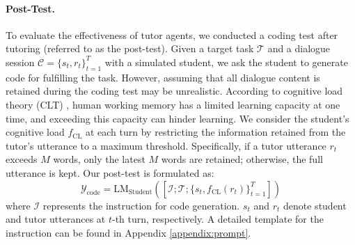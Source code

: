 \paragraph{Post-Test.}
To evaluate the effectiveness of tutor agents, we conducted a coding test after tutoring (referred to as the post-test). Given a target task $\mathcal{T}$ and a dialogue session $\mathcal{C}=\{s_t, r_t\}_{t=1}^{T}$ with a simulated student, we ask the student to generate code for fulfilling the task. 
However, assuming that all dialogue content is retained during the coding test may be unrealistic. According to cognitive load theory (CLT) \cite{miller1956magical,sweller2011cognitive}, human working memory has a limited learning capacity at one time, and exceeding this capacity can hinder learning. We consider the student's cognitive load $f_{\text{CL}}$ at each turn by restricting the information retained from the tutor’s utterance to a maximum threshold. Specifically, if a tutor utterance $r_t$ exceeds $M$ words, only the latest $M$ words are retained; otherwise, the full utterance is kept. Our post-test is formulated as:
\begin{equation}
\label{eq:post_test}
    \mathcal{Y}_{\text{code}}=\text{LM}_{\text{Student}}([\mathcal{I};\mathcal{T};\{s_t, f_{\text{CL}}(r_t)\}_{t=1}^{T}])
\end{equation}
where $\mathcal{I}$ represents the instruction for code generation. $s_t$ and $r_t$ denote student and tutor utterances at $t$-th turn, respectively. A detailed template for the instruction can be found in Appendix \ref{appendix:prompt}.




